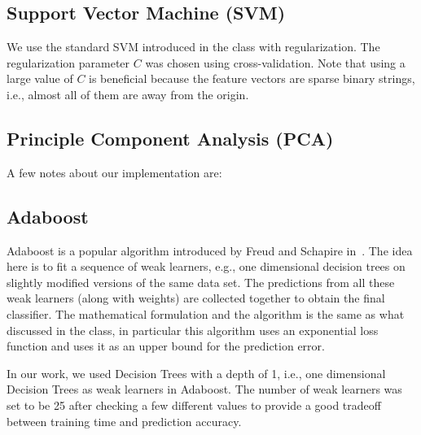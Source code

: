 \documentclass[11pt, letterpaper, conference, final, twocolumn]{ieeeconf}
\begin{document}
\subsection{Support Vector Machine (SVM)}
\label{ssec:svm}

We use the standard SVM introduced in the class with regularization. The regularization parameter $C$ was chosen using cross-validation. Note that using a large value of $C$ is beneficial because the feature vectors are sparse binary strings, i.e., almost all of them are away from the origin. 

\subsection{Principle Component Analysis (PCA)}
\label{ssec:pca}

A few notes about our implementation are:

\subsection{Adaboost}
\label{ssec:adaboost}
%
Adaboost is a popular algorithm introduced by Freud and Schapire in~\cite{freund1999short}. The idea here is to fit a sequence of weak learners, e.g., one dimensional decision trees on slightly modified versions of the same data set. The predictions from all these weak learners (along with weights) are collected together to obtain the final classifier. The mathematical formulation and the algorithm is the same as what discussed in the class, in particular this algorithm uses an exponential loss function and uses it as an upper bound for the prediction error.

In our work, we used Decision Trees with a depth of 1, i.e., one dimensional Decision Trees as weak learners in Adaboost. The number of weak learners was set to be 25 after checking a few different values to provide a good tradeoff between training time and prediction accuracy.
\end{document}

